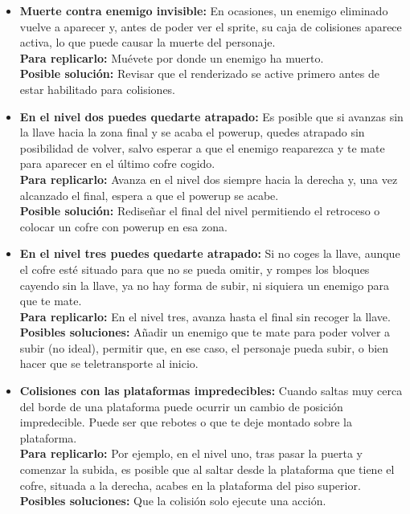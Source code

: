 \documentclass[12pt,a4paper,twoside,spanish]{article}      %
\begin{document}
\begin{itemize}
    \item \textbf{Muerte contra enemigo invisible:} En ocasiones, un enemigo eliminado vuelve a aparecer y, antes de poder ver el sprite, su caja de colisiones aparece activa, lo que puede causar la muerte del personaje.\\[1mm]
    \textbf{Para replicarlo:} Muévete por donde un enemigo ha muerto.\\[1mm]
    \textbf{Posible solución:} Revisar que el renderizado se active primero antes de estar habilitado para colisiones.
    
    \item \textbf{En el nivel dos puedes quedarte atrapado:} Es posible que si avanzas sin la llave hacia la zona final y se acaba el powerup, quedes atrapado sin posibilidad de volver, salvo esperar a que el enemigo reaparezca y te mate para aparecer en el último cofre cogido.\\[1mm]
    \textbf{Para replicarlo:} Avanza en el nivel dos siempre hacia la derecha y, una vez alcanzado el final, espera a que el powerup se acabe.\\[1mm]
    \textbf{Posible solución:} Rediseñar el final del nivel permitiendo el retroceso o colocar un cofre con powerup en esa zona.
    
    \item \textbf{En el nivel tres puedes quedarte atrapado:} Si no coges la llave, aunque el cofre esté situado para que no se pueda omitir, y rompes los bloques cayendo sin la llave, ya no hay forma de subir, ni siquiera un enemigo para que te mate.\\[1mm]
    \textbf{Para replicarlo:} En el nivel tres, avanza hasta el final sin recoger la llave.\\[1mm]
    \textbf{Posibles soluciones:} Añadir un enemigo que te mate para poder volver a subir (no ideal), permitir que, en ese caso, el personaje pueda subir, o bien hacer que se teletransporte al inicio.
    
    \item \textbf{Colisiones con las plataformas impredecibles:} Cuando saltas muy cerca del borde de una plataforma puede ocurrir un cambio de posición impredecible. Puede ser que rebotes o que te deje montado sobre la plataforma.\\[1mm]
    \textbf{Para replicarlo:} Por ejemplo, en el nivel uno, tras pasar la puerta y comenzar la subida, es posible que al saltar desde la plataforma que tiene el cofre, situada a la derecha, acabes en la plataforma del piso superior.\\[1mm]
    \textbf{Posibles soluciones:} Que la colisión solo ejecute una acción.
    

\end{itemize}
\end{document}
